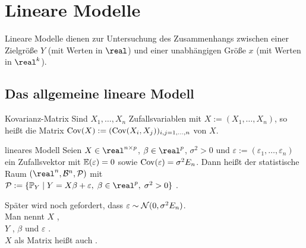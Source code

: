 \section{%
    Lineare Modelle%
}

\begin{Bem}
    Lineare Modelle dienen zur Untersuchung des Zusammenhangs zwischen einer Zielgröße $Y$
    (mit Werten in $\real$) und einer unabhängigen Größe $x$ (mit Werten in $\real^k$).
\end{Bem}

\subsection{%
    Das allgemeine lineare Modell%
}

\begin{Def}{Kovarianz-Matrix}
    Sind $X_1, \dotsc, X_n$ Zufallsvariablen mit $X := (X_1, \dotsc, X_n)$,
    so heißt die Matrix $\mathrm{Cov}(X) := (\mathrm{Cov}(X_i, X_j))_{i,j=1,\dotsc,n}$
     von $X$.
\end{Def}

\begin{Def}{lineares Modell}
    Seien $X \in \real^{n \times p}$, $\beta \in \real^p$, $\sigma^2 > 0$ und
    $\varepsilon := (\varepsilon_1, \dotsc, \varepsilon_n)$ ein
    Zufallsvektor mit $\mathbb{E}(\varepsilon) = 0$ sowie
    $\mathrm{Cov}(\varepsilon) = \sigma^2 E_n$.
    Dann heißt der statistische Raum $(\real^n, \B^n, \P)$ mit\\
    $\P := \{\PP_Y \;|\; Y = X\beta + \varepsilon,\; \beta \in \real^p,\; \sigma^2 > 0\}$
    .
\end{Def}

\begin{Bem}
    Später wird noch gefordert, dass $\varepsilon \sim \mathcal{N}(0, \sigma^2 E_n)$.\\
    Man nennt
    $X$ ,\\
    $Y$ ,
    $\beta$  und
    $\varepsilon$ .\\
    $X$ als Matrix heißt auch .
\end{Bem}

\linie

